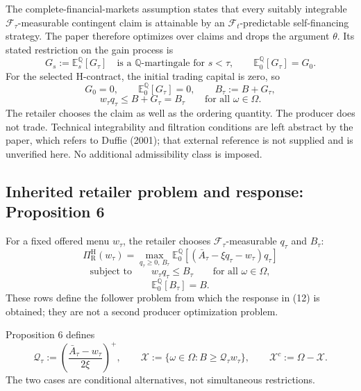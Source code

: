 \documentclass{article}
\begin{document}
The complete-financial-markets assumption states that every suitably
integrable $\mathscr F_\tau$-measurable contingent claim is attainable by
an $\mathscr F_t$-predictable self-financing strategy. The paper therefore
optimizes over claims and drops the argument $\theta$. Its stated
restriction on the gain process is
\[
G_s:=\mathbb E_s^{\mathbb Q}[G_\tau]
\quad\text{is a }\mathbb Q\text{-martingale for }s<\tau,
\qquad
\mathbb E_0^{\mathbb Q}[G_\tau]=G_0.
\]
For the selected H-contract, the initial trading capital is zero, so
\[
G_0=0,\qquad \mathbb E_0^{\mathbb Q}[G_\tau]=0,
\qquad B_\tau:=B+G_\tau,
\]
\[
w_\tau q_\tau\leqslant B+G_\tau=B_\tau
\qquad\text{for all }\omega\in\Omega.
\]
The retailer chooses the claim as well as the ordering quantity.
The producer does not trade. Technical integrability and filtration
conditions are left abstract by the paper, which refers to Duffie
(2001); that external reference is not supplied and is unverified here.
No additional admissibility class is imposed.

\subsection*{Inherited retailer problem and response: Proposition 6}

For a fixed offered menu $w_\tau$, the retailer chooses
$\mathscr F_\tau$-measurable $q_\tau$ and $B_\tau$:
\begin{equation}
\Pi_{\mathrm R}^{\mathrm H}(w_\tau)
=\max_{q_\tau\geqslant0,\,B_\tau}
\mathbb E_0^{\mathbb Q}
\left[(\bar A_\tau-\xi q_\tau-w_\tau)q_\tau\right]
\tag{9}
\end{equation}
\begin{equation}
\text{subject to}\qquad
w_\tau q_\tau\leqslant B_\tau
\qquad\text{for all }\omega\in\Omega,
\tag{10}
\end{equation}
\begin{equation}
\mathbb E_0^{\mathbb Q}[B_\tau]=B.
\tag{11}
\end{equation}
These rows define the follower problem from which the response in (12)
is obtained; they are not a second producer optimization problem.

Proposition 6 defines
\[
\mathscr Q_\tau:=\left(\frac{\bar A_\tau-w_\tau}{2\xi}\right)^+,
\qquad
\mathscr X:=\{\omega\in\Omega:B\geqslant\mathscr Q_\tau w_\tau\},
\qquad
\mathscr X^c:=\Omega-\mathscr X.
\]
The two cases are conditional alternatives, not simultaneous restrictions.
\end{document}
